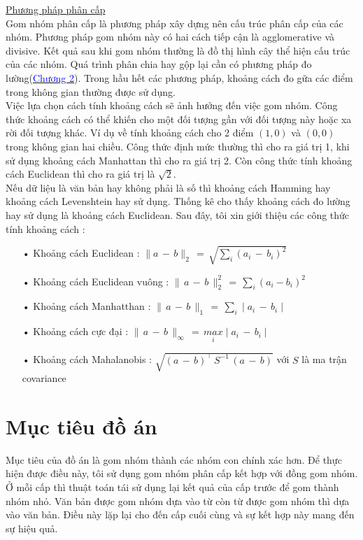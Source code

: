 \underline{Phương pháp phân cấp}\\
\hspace*{10mm}Gom nhóm phân cấp là phương pháp xây dựng nên cấu trúc phân cấp của các nhóm. Phương pháp gom nhóm này có hai cách tiếp cận là agglomerative và divisive. Kết quả sau khi gom nhóm thường là đồ thị hình cây thể hiện cấu trúc của các nhóm. Quá trình phân chia hay gộp lại cần có phương pháp đo lường(\hyperref[Chapter2]{\textcolor{blue}{Chương 2}}). Trong hầu hết các phương pháp, khoảng cách đo gữa các điểm trong không gian thường được sử dụng.\\
\hspace*{10mm}Việc lựa chọn cách tính khoảng cách sẽ ảnh hưởng đến việc gom nhóm. Công thức khoảng cách có thể khiến cho một đối tượng gần với đối tượng này hoặc xa rời đối tượng khác. Ví dụ về tính khoảng cách cho 2 điểm $(1, 0)$ và $(0, 0)$ trong không gian hai chiều. Công thức định mức thường thì cho ra giá trị 1, khi sử dụng khoảng cách Manhattan thì cho ra giá trị 2. Còn công thức tính khoảng cách Euclidean thì cho ra giá trị là $\sqrt{2}$.\\
\hspace*{10mm}Nếu dữ liệu là văn bản hay không phải là số thì khoảng cách Hamming hay khoảng cách Levenshtein hay sử dụng. Thống kê cho thấy khoảng cách đo lường hay sử dụng là khoảng cách Euclidean. Sau đây, tôi xin giới thiệu các công thức tính khoảng cách :
\begin{enumerate}
\item[•]Khoảng cách Euclidean : $\parallel a \,- \, b \parallel_2 \, = \, \sqrt{\underset{i}{\sum}(a_i \, - \, b_i)^2} $
\item[•]Khoảng cách Euclidean vuông : $\parallel \, a \, - \, b \, \parallel^2_2 \, = \, \underset{i}{\sum} (a_i - b_i)^2$
\item[•]Khoảng cách Manhatthan : $\parallel \, a \, - \, b \, \parallel_1 \, = \, \underset{i}{\sum} \mid a_i \, - \, b_i\mid$
\item[•]Khoảng cách cực đại : $\parallel \, a \, - \, b\, \parallel_\infty \, = \, \underset{i}{max} \mid a_i \, - \, b_i \mid$
\item[•]Khoảng cách Mahalanobis : $\sqrt{(a \, - \, b)^{\top} \, S^{-1} \, (a \, - \, b)}$ với $S$ là ma trận covariance
\end{enumerate}

\hspace*{10mm}

\section{Mục tiêu đồ án}
\hspace{10mm}Mục tiêu của đồ án là gom nhóm thành các nhóm con chính xác hơn. Để thực hiện được điều này, tôi sử dụng gom nhóm phân cấp kết hợp với đồng gom nhóm. Ở mỗi cấp thì thuật toán tái sử dụng lại kết quả của cấp trước để gom thành nhóm nhỏ. Văn bản được gom nhóm dựa vào từ còn từ được gom nhóm thì dựa vào văn bản. Điều này lặp lại cho đến cấp cuối cùng và sự kết hợp này mang đến sự hiệu quả.

